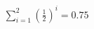 \documentclass[preview]{standalone}
\begin{document}
\begin{align*}
\sum_{i=1}^{2} \left(\frac{1}{2}\right)^i = {0.75}
\end{align*}
\end{document}
